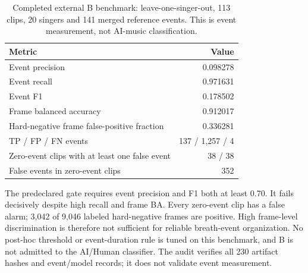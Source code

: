 \begin{table}[htbp]
\centering\small
\caption{Completed external B benchmark: leave-one-singer-out, 113 clips, 20 singers and 141 merged reference events. This is event measurement, not AI-music classification.}
\label{tab:breath-external-failed}
\begin{tabular}{lr}
\toprule Metric & Value \\
\midrule
Event precision & 0.098278 \\
Event recall & 0.971631 \\
Event F1 & 0.178502 \\
Frame balanced accuracy & 0.912017 \\
Hard-negative frame false-positive fraction & 0.336281 \\
TP / FP / FN events & 137 / 1,257 / 4 \\
Zero-event clips with at least one false event & 38 / 38 \\
False events in zero-event clips & 352 \\
\bottomrule
\end{tabular}
\end{table}

The predeclared gate requires event precision and F1 both at least 0.70. It fails decisively despite high recall and frame BA. Every zero-event clip has a false alarm; 3,042 of 9,046 labeled hard-negative frames are positive. High frame-level discrimination is therefore not sufficient for reliable breath-event organization. No post-hoc threshold or event-duration rule is tuned on this benchmark, and B is not admitted to the AI/Human classifier. The audit verifies all 230 artifact hashes and event/model records; it does not validate event measurement.
